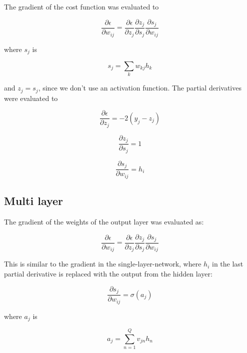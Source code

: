 \documentclass{article}
\begin{document}
The gradient of the cost function was evaluated to

\begin{equation}
  \frac{\partial \epsilon}{\partial w_{ij}} =
  \frac{\partial \epsilon}{\partial z_j}
  \frac{\partial z_j}{\partial s_j}
  \frac{\partial s_j}{\partial w_{ij}}
\end{equation}

where $s_j$ is

\begin{equation}
  s_j = \sum_{k}{w_{kj}h_k}
\end{equation}

and $z_j = s_j$, since we don't use an activation function.
The partial derivatives were evaluated to

\begin{equation}
    \frac{\partial \epsilon}{\partial z_j} = -2(y_j - z_j)
\end{equation}

\begin{equation}
    \frac{\partial z_j}{\partial s_j} = 1
\end{equation}

\begin{equation}
    \frac{\partial s_j}{\partial w_{ij}} = h_i
\end{equation}

\subsection{Multi layer}

The gradient of the weights of the output layer was evaluated as:

\begin{equation}
  \frac{\partial \epsilon}{\partial w_{ij}} =
  \frac{\partial \epsilon}{\partial z_j}
  \frac{\partial z_j}{\partial s_j}
  \frac{\partial s_j}{\partial w_{ij}}
\end{equation}

This is similar to the gradient in the single-layer-network, where $h_i$
in the last partial derivative is replaced with the output from the hidden
layer:

\begin{equation}
    \frac{\partial s_j}{\partial w_{ij}} = \sigma(a_j)
\end{equation}

where $a_j$ is 

\begin{equation}
    a_j = \sum_{n=1}^Q v_{jn}h_n
\end{equation}
\end{document}

